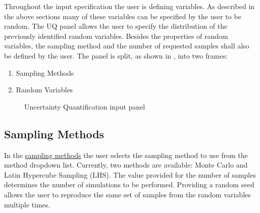 Throughout the input specification the user is defining variables. As
described in the above sections many of these variables can be
specified by the user to be random. The UQ panel allows the user to specify the distribution of the previously identified random variables. Besides the properties of random variables, the sampling method and the number of requested samples shall also be defined by the user. The panel is split, as shown
in , into two frames:

\begin{enumerate}
\item Sampling Methods 
\item Random Variables
\end{enumerate}

\begin{figure}[!htbp]
  \caption{Uncertainty Quantification input panel}
  \label{fig:uq_panel}
\end{figure}

\subsection{Sampling Methods}
In the \href{https://dakota.sandia.gov//sites/default/files/docs/6.9/html-ref/method-sampling.html}{sampling methods} the user selects the sampling 
method to use from the method dropdown list. Currently, two methods are available: 
Monte Carlo and Latin Hypercube Sampling (LHS). The value provided for the number of samples determines the number of simulations to be performed. Providing a random seed allows the user to reproduce the same set of samples from the random variables multiple times.


